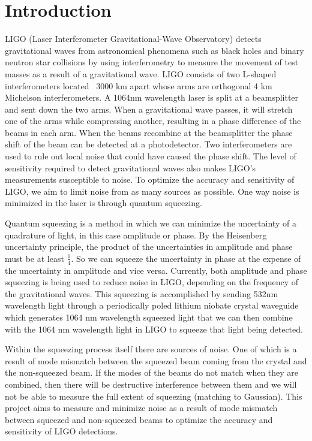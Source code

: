 \documentclass[colorlinks=true,pdfstartview=FitV,linkcolor=blue,
citecolor=red,urlcolor=magenta]{ligodoc}
\title{}
\author{Nora Dreslin}
\begin{document}
\tableofcontents

\newpage
\section{Introduction}
LIGO (Laser Interferometer Gravitational-Wave Observatory) detects gravitational waves from astronomical phenomena such as black holes and binary neutron star collisions by using interferometry to measure the movement of test masses as a result of a gravitational wave. LIGO consists of two L-shaped interferometers located ~3000 km apart whose arms are orthogonal 4 km Michelson interferometers. A 1064nm wavelength laser is split at a beamsplitter and sent down the two arms. When a gravitational wave passes, it will stretch one of the arms while compressing another, resulting in a phase difference of the beams in each arm. When the beams recombine at the beamsplitter the phase shift of the beam can be detected at a photodetector. Two interferometers are used to rule out local noise that could have caused the phase shift. The level of sensitivity required to detect gravitational waves also makes LIGO's measurements susceptible to noise. To optimize the accuracy and sensitivity of LIGO, we aim to limit noise from as many sources as possible. One way noise is minimized in the laser is through quantum squeezing. 

Quantum squeezing is a method in which we can minimize the uncertainty of a quadrature of light, in this case amplitude or phase. By the Heisenberg uncertainty principle, the product of the uncertainties in amplitude and phase must be at least $\frac{1}{4}$. So we can squeeze the uncertainty in phase at the expense of the uncertainty in amplitude and vice versa. Currently, both amplitude and phase squeezing is being used to reduce noise in LIGO, depending on the frequency of the gravitational waves. This squeezing is accomplished by sending 532nm wavelength light through a periodically poled lithium niobate crystal waveguide which generates 1064 nm wavelength squeezed light that we can then combine with the 1064 nm wavelength light in LIGO to squeeze that light being detected. 

Within the squeezing process itself there are sources of noise. One of which is a result of mode mismatch between the squeezed beam coming from the crystal and the non-squeezed beam. If the modes of the beams do not match when they are combined, then there will be destructive interference between them and we will not be able to measure the full extent of squeezing (matching to Gaussian). This project aims to measure and minimize noise as a result of mode mismatch between squeezed and non-squeezed beams to optimize the accuracy and sensitivity of LIGO detections.
\end{document}
